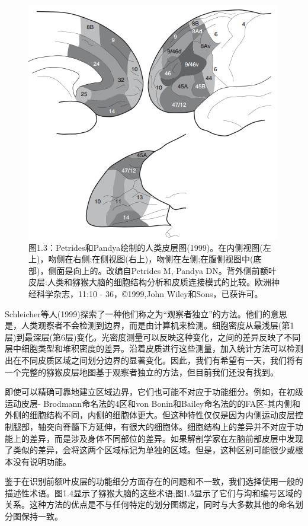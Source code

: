 \begin{figure}[!htb]
	\centering
	\includegraphics[width=0.5\linewidth]{image_pfc/Fig_1_3}
	\caption*{图1.3：Petrides和Pandya绘制的人类皮层图(1999)。在内侧视图(左上)，吻侧在右侧;在侧视图(右上)，吻侧在左侧;在腹侧视图中(底部)，侧面是向上的。改编自Petrides M, Pandya DN。背外侧前额叶皮层:人类和猕猴大脑的细胞结构分析和皮质连接模式的比较。欧洲神经科学杂志，11:10 - 36，©1999,John Wiley和Sons，已获许可。}
\end{figure}


\par
Schleicher等人(1999)探索了一种他们称之为“观察者独立”的方法。他们的意思是，人类观察者不会检测到边界，而是由计算机来检测。细胞密度从最浅层(第1层)到最深层(第6层)变化。光密度测量可以反映这种变化，之间的差异反映了不同层中细胞类型和堆积密度的差异。沿着皮质进行这些测量，加入统计方法可以检测出在不同皮质区域之间划分边界的显著变化。因此，我们有希望有一天，我们将有一个完整的猕猴皮层地图基于观察者独立的方法，但目前我们还没有找到。

\par
即使可以精确可靠地建立区域边界，它们也可能不对应于功能细分。例如，在初级运动皮层- Brodmann命名法的4区和von Bonin和Bailey命名法的的FA区-其内侧和外侧的细胞结构不同，内侧的细胞体更大。但这种特性仅仅是因为内侧运动皮层控制腿部，轴突向脊髓下方延伸，有很大的细胞体。细胞结构上的差异并不对应于功能上的差异，而是涉及身体不同部位的差异。如果解剖学家在左脑前部皮层中发现了类似的差异，会将这两个区域标记为单独的区域。但是，这种区别可能很少或根本没有说明功能。

\par
鉴于在识别前额叶皮层的功能细分方面存在的问题和不一致，我们选择使用一般的描述性术语。图1.4显示了猕猴大脑的这些术语;图1.5显示了它们与沟和编号区域的关系。这种方法的优点是不与任何特定的划分图绑定，同时与大多数其他的命名划分图保持一致。

